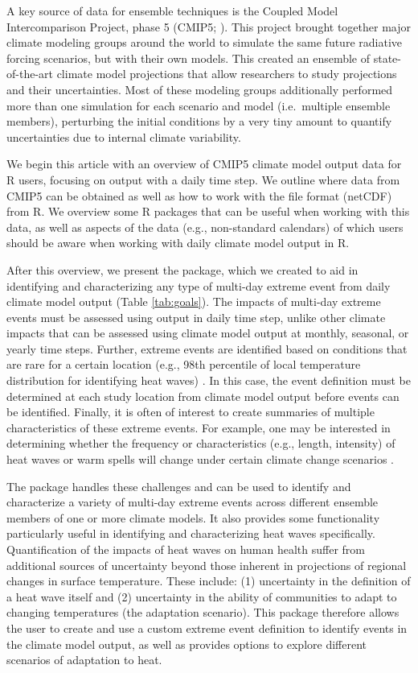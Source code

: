 A key source of data for ensemble techniques is the Coupled Model
Intercomparison Project, phase 5 (CMIP5; \citet{taylor2012overview}).
This project brought together major climate modeling groups around the
world to simulate the same future radiative forcing scenarios, but with
their own models. This created an ensemble of state-of-the-art climate
model projections that allow researchers to study projections and their
uncertainties. Most of these modeling groups additionally performed more
than one simulation for each scenario and model (i.e.~multiple ensemble
members), perturbing the initial conditions by a very tiny amount to
quantify uncertainties due to internal climate variability.

We begin this article with an overview of CMIP5 climate model output
data for R users, focusing on output with a daily time step. We outline
where data from CMIP5 can be obtained as well as how to work with the
file format (netCDF) from R. We overview some R packages that can be
useful when working with this data, as well as aspects of the data
(e.g., non-standard calendars) of which users should be aware when
working with daily climate model output in R.

After this overview, we present the  package,
which we created to aid in identifying and characterizing any type of
multi-day extreme event from daily climate model output (Table
\ref{tab:goals}). The impacts of multi-day extreme events must be
assessed using output in daily time step, unlike other climate impacts
that can be assessed using climate model output at monthly, seasonal, or
yearly time steps. Further, extreme events are identified based on
conditions that are rare for a certain location (e.g., 98th percentile
of local temperature distribution for identifying heat waves)
\citep{IPCCch1}. In this case, the event definition must be determined
at each study location from climate model output before events can be
identified. Finally, it is often of interest to create summaries of
multiple characteristics of these extreme events. For example, one may
be interested in determining whether the frequency or characteristics
(e.g., length, intensity) of heat waves or warm spells will change under
certain climate change scenarios \citep{IPCCch1}.

The  package handles these challenges and can be
used to identify and characterize a variety of multi-day extreme events
across different ensemble members of one or more climate models. It also
provides some functionality particularly useful in identifying and
characterizing heat waves specifically. Quantification of the impacts of
heat waves on human health suffer from additional sources of uncertainty
beyond those inherent in projections of regional changes in surface
temperature. These include: (1) uncertainty in the definition of a heat
wave itself and (2) uncertainty in the ability of communities to adapt
to changing temperatures (the adaptation scenario). This package
therefore allows the user to create and use a custom extreme event
definition to identify events in the climate model output, as well as
provides options to explore different scenarios of adaptation to heat.

